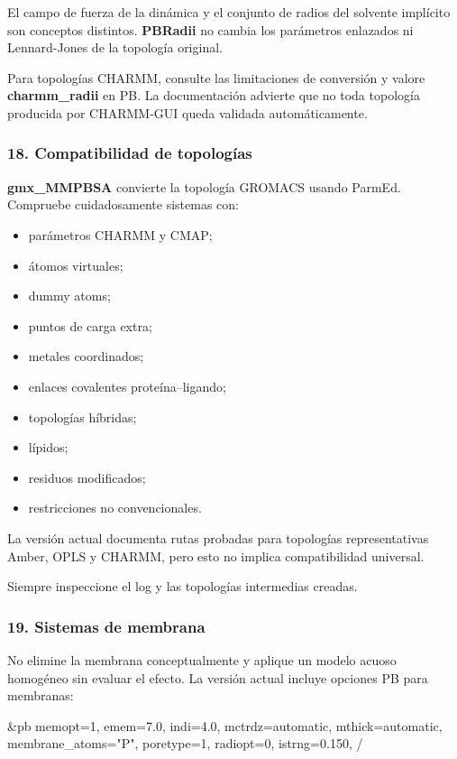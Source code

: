 \documentclass[
  spanish,
  11pt,
  a4paper]{article}
\newenvironment{Shaded}{\begin{snugshade}}{\end{snugshade}}
\newcommand{\NormalTok}[1]{#1}
\providecommand{\tightlist}{%
  \setlength{\itemsep}{0pt}\setlength{\parskip}{0pt}}
\begin{document}
El campo de fuerza de la dinámica y el conjunto de radios del solvente
implícito son conceptos distintos. \textbf{PBRadii} no cambia los
parámetros enlazados ni Lennard-Jones de la topología original.

Para topologías CHARMM, consulte las limitaciones de conversión y valore
\textbf{charmm\_radii} en PB. La documentación advierte que no toda
topología producida por CHARMM-GUI queda validada automáticamente.

\subsubsection{18. Compatibilidad de
topologías}\label{compatibilidad-de-topologuxedas}

\textbf{gmx\_MMPBSA} convierte la topología GROMACS usando ParmEd.
Compruebe cuidadosamente sistemas con:

\begin{itemize}
\tightlist
\item
  parámetros CHARMM y CMAP;
\item
  átomos virtuales;
\item
  dummy atoms;
\item
  puntos de carga extra;
\item
  metales coordinados;
\item
  enlaces covalentes proteína--ligando;
\item
  topologías híbridas;
\item
  lípidos;
\item
  residuos modificados;
\item
  restricciones no convencionales.
\end{itemize}

La versión actual documenta rutas probadas para topologías
representativas Amber, OPLS y CHARMM, pero esto no implica
compatibilidad universal.

Siempre inspeccione el log y las topologías intermedias creadas.

\subsubsection{19. Sistemas de membrana}\label{sistemas-de-membrana}

No elimine la membrana conceptualmente y aplique un modelo acuoso
homogéneo sin evaluar el efecto. La versión actual incluye opciones PB
para membranas:

\begin{Shaded}
\begin{Highlighting}[]
\NormalTok{\&pb}
\NormalTok{  memopt=1,}
\NormalTok{  emem=7.0,}
\NormalTok{  indi=4.0,}
\NormalTok{  mctrdz=automatic,}
\NormalTok{  mthick=automatic,}
\NormalTok{  membrane\_atoms="P",}
\NormalTok{  poretype=1,}
\NormalTok{  radiopt=0,}
\NormalTok{  istrng=0.150,}
\NormalTok{/}
\end{Highlighting}
\end{Shaded}
\end{document}
